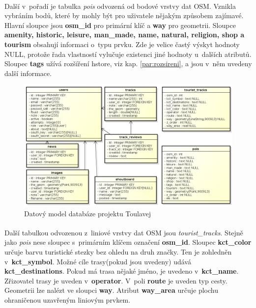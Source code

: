 \documentclass[11pt,a4paper,titlepage,oneside]{book}
\begin{document}
				\paragraph{}Další v~pořadí je tabulka \textit{pois} odvozená od bodové vrstvy dat \ac{OSM}. Vznikla vybráním bodů, které by mohly být pro uživatele nějakým způsobem zajímavé. Hlavní sloupce jsou \textbf{osm\_id} pro primární klíč a \textbf{way} pro geometrii. Sloupce \textbf{amenity, historic, leisure, man\_made, name, natural, religion, shop a tourism} obsahují informaci o~typu prvku. Zde je velice častý výskyt hodnoty NULL, protože řada vlastností vylučuje existenci jiné hodnoty u~dalších atributů. Sloupec \textbf{tags} užívá rozšíření hstore, viz kap. \ref{par:rozsireni}, a jsou v~něm uvedeny další informace.
		\begin{figure}[!h]
			\begin{center}
				\includegraphics[width=13cm]{obrazky/datovy_model.png}
				\caption{Datový model databáze projektu Toulavej}
				\label{fig:db}
			\end{center}
		\end{figure}
                        \paragraph{} Další tabulkou odvozenou z~liniové vrstvy dat \ac{OSM} jsou \textit{tourist\_tracks}. Stejně jako \textit{pois} nese sloupec s~primárním klíčem označení \textbf{osm\_id}. Sloupec \textbf{kct\_color} určuje barvu turistické stezky bez ohledu na druh značky. Ten je zohledněn v~\textbf{kct\_symbol}. Možné cíle trasy(pokud jsou uvedeny) udává \textbf{kct\_destinations}. Pokud má trasa nějaké jméno, je uvedeno v~\textbf{kct\_name}. Zřizovatel trasy je uveden v~\textbf{operator}. V~poli \textbf{route} je uveden typ cesty. Geometrii lze nalézt ve sloupci \textbf{way}. Atribut \textbf{way\_area} určuje plochu ohraničenou uzavřeným liniovým prvkem.
\end{document}
